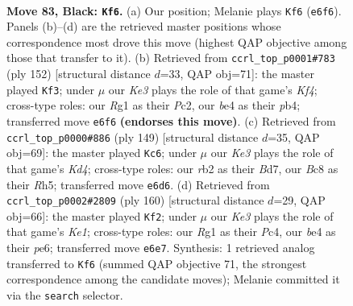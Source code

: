 \documentclass[11pt]{article}
\begin{document}
\clearpage

\begin{figure}[p]\centering
\begin{subfigure}{0.46\textwidth}\centering
\resizebox{\linewidth}{!}{%
\newchessgame
\chessboard[
  setfen={1Bb5/2N5/4k3/1P6/P3B3/2K4p/1R6/6r1 b - - 6 83},
  showmover=false,
  pgfstyle=straightmove, color=movearrow, markmove={e6-f6}
]}
\caption{}
\end{subfigure}\hfill
\begin{subfigure}{0.46\textwidth}\centering
\resizebox{\linewidth}{!}{%
\newchessgame
\chessboard[
  setfen={8/4b3/6B1/2kn4/1p3K1p/8/2PB2P1/8 w - - 51 77},
  showmover=false,
  pgfstyle=straightmove, color=movearrow, markmove={f4-f3}
]}
\caption{}
\end{subfigure}
\\[4pt]
\begin{subfigure}{0.46\textwidth}\centering
\resizebox{\linewidth}{!}{%
\newchessgame
\chessboard[
  setfen={8/3bB2p/3P3P/3k3r/8/3R4/2P5/2K5 b - - 56 75},
  showmover=false,
  pgfstyle=straightmove, color=movearrow, markmove={d5-c6}
]}
\caption{}
\end{subfigure}\hfill
\begin{subfigure}{0.46\textwidth}\centering
\resizebox{\linewidth}{!}{%
\newchessgame
\chessboard[
  setfen={2R5/8/4pk2/6pb/B1P5/5n2/8/4K3 w - - 4 81},
  showmover=false,
  pgfstyle=straightmove, color=movearrow, markmove={e1-f2}
]}
\caption{}
\end{subfigure}
\caption{\textbf{Move 83, Black: \texttt{Kf6}.} (a) Our position; Melanie plays \texttt{Kf6} (\texttt{e6f6}). Panels (b)--(d) are the retrieved master positions whose correspondence most drove this move (highest QAP objective among those that transfer to it). (b) Retrieved from \texttt{ccrl\_top\_p0001\#783} (ply 152) [structural distance $d$=33, QAP obj=71]: the master played \texttt{Kf3}; under $\mu$ our \emph{Ke3} plays the role of that game's \emph{Kf4}; cross-type roles: our \emph{R}g1 as their \emph{P}c2, our \emph{b}e4 as their \emph{p}b4; transferred move \texttt{e6f6} \textbf{(endorses this move)}. (c) Retrieved from \texttt{ccrl\_top\_p0000\#886} (ply 149) [structural distance $d$=35, QAP obj=69]: the master played \texttt{Kc6}; under $\mu$ our \emph{Ke3} plays the role of that game's \emph{Kd4}; cross-type roles: our \emph{r}b2 as their \emph{B}d7, our \emph{B}c8 as their \emph{R}h5; transferred move \texttt{e6d6}. (d) Retrieved from \texttt{ccrl\_top\_p0002\#2809} (ply 160) [structural distance $d$=29, QAP obj=66]: the master played \texttt{Kf2}; under $\mu$ our \emph{Ke3} plays the role of that game's \emph{Ke1}; cross-type roles: our \emph{R}g1 as their \emph{P}c4, our \emph{b}e4 as their \emph{p}e6; transferred move \texttt{e6e7}. Synthesis: 1 retrieved analog transferred to \texttt{Kf6} (summed QAP objective 71, the strongest correspondence among the candidate moves); Melanie committed it via the \texttt{search} selector.}
\label{fig:thought-m165}
\end{figure}
\end{document}
